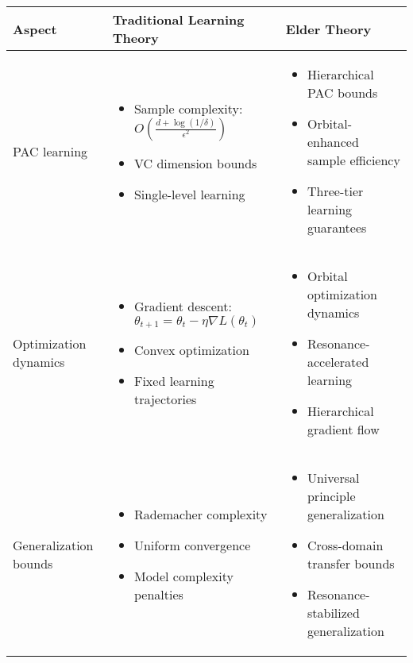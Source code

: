 \begin{center}
\begin{tabular}{|p{3cm}|p{5cm}|p{5cm}|}
\hline
\textbf{Aspect} & \textbf{Traditional Learning Theory} & \textbf{Elder Theory} \\
\hline
PAC learning & 
\begin{itemize}
    \item Sample complexity: $O\left(\frac{d + \log(1/\delta)}{\epsilon^2}\right)$
    \item VC dimension bounds
    \item Single-level learning
\end{itemize} &
\begin{itemize}
    \item Hierarchical PAC bounds
    \item Orbital-enhanced sample efficiency
    \item Three-tier learning guarantees
\end{itemize} \\
\hline
Optimization dynamics & 
\begin{itemize}
    \item Gradient descent: $\theta_{t+1} = \theta_t - \eta \nabla L(\theta_t)$
    \item Convex optimization
    \item Fixed learning trajectories
\end{itemize} &
\begin{itemize}
    \item Orbital optimization dynamics
    \item Resonance-accelerated learning
    \item Hierarchical gradient flow
\end{itemize} \\
\hline
Generalization bounds & 
\begin{itemize}
    \item Rademacher complexity
    \item Uniform convergence
    \item Model complexity penalties
\end{itemize} &
\begin{itemize}
    \item Universal principle generalization
    \item Cross-domain transfer bounds
    \item Resonance-stabilized generalization
\end{itemize} \\

\end{tabular}
\end{center}
